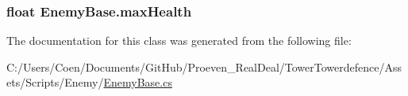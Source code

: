 \subsubsection[{\texorpdfstring{max\+Health}{maxHealth}}]{\setlength{\rightskip}{0pt plus 5cm}float Enemy\+Base.\+max\+Health}\hypertarget{class_enemy_base_a3c546ced55e1151b9fff4fbb231829fc}{}\label{class_enemy_base_a3c546ced55e1151b9fff4fbb231829fc}


The documentation for this class was generated from the following file\+:\begin{DoxyCompactItemize}
\item 
C\+:/\+Users/\+Coen/\+Documents/\+Git\+Hub/\+Proeven\+\_\+\+Real\+Deal/\+Tower\+Towerdefence/\+Assets/\+Scripts/\+Enemy/\hyperlink{_enemy_base_8cs}{Enemy\+Base.\+cs}\end{DoxyCompactItemize}
